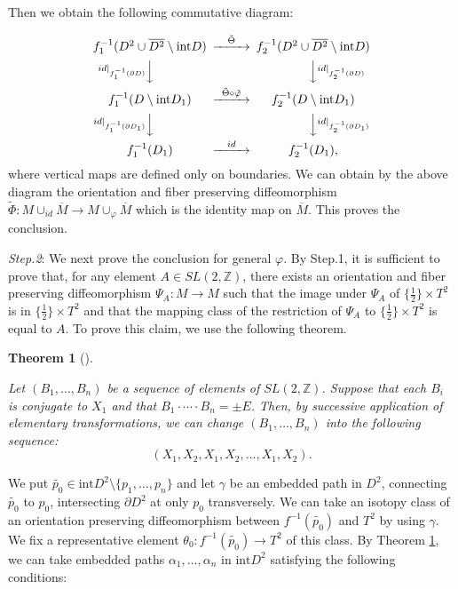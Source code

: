 \documentclass{amsart}
\theoremstyle{plain}
\newtheorem{thm}{Theorem}[section]
\theoremstyle{definition}
\begin{document}
Then we obtain the following commutative diagram: 

\[
\begin{CD}
f_1^{-1}(D^2\cup \overline{D^2}\setminus\text{int}D) @>\tilde{\Theta}>> f_2^{-1}(D^2\cup \overline{D^2}\setminus\text{int}D) \\
@V id|_{f_1^{-1}(\partial D)} VV @VV id|_{f_2^{-1}(\partial D)} V \\
f_1^{-1}(D\setminus\text{int}D_1) @>\tilde{\Theta}\circ\tilde{\varphi}>> f_2^{-1}(D\setminus\text{int}D_1) \\
@V id|_{f_1^{-1}(\partial D_1)} VV @VV id|_{f_2^{-1}(\partial D_1)} V \\
f_1^{-1}(D_1) @>id>> f_2^{-1}(D_1) ,
\end{CD}
\]
where vertical maps are defined only on boundaries. 
We can obtain by the above diagram the orientation and fiber preserving diffeomorphism $\tilde{\Phi}:M\cup_{id}\overline{M}\rightarrow M\cup_{\varphi}\overline{M}$ 
which is the identity map on $\overline{M}$. 
This proves the conclusion. 

\par

{\it Step.2}: We next prove the conclusion for general $\varphi$. 
By Step.1, it is sufficient to prove that, for any element $A\in SL(2,\mathbb{Z})$, there exists an orientation and fiber preserving diffeomorphism $\Psi_A:M\rightarrow M$ 
such that the image under $\Psi_A$ of $\{\frac{1}{2}\}\times T^2$ is in $\{\frac{1}{2}\}\times T^2$ and that the mapping class of the restriction of $\Psi_A$ to $\{\frac{1}{2}\}\times T^2$ is equal to $A$. 
To prove this claim, we use the following theorem. 

\begin{thm}[\cite{Matsumoto2}]\label{Matsumoto-thm}

Let $(B_1,\ldots,B_n)$ be a sequence of elements of $SL(2,\mathbb{Z})$. 
Suppose that each $B_i$ is conjugate to $X_1$ and that $B_1\cdot\cdots\cdot B_n=\pm E$. 
Then, by successive application of elementary transformations, we can change $(B_1,\ldots,B_n)$ into the following sequence: 
\[
(X_1,X_2,X_1,X_2,\ldots,X_1,X_2). 
\]

\end{thm}

We put $\tilde{p_0}\in\text{int}D^2\setminus\{p_1,\ldots,p_n\}$ and let $\gamma$ be an embedded path in $D^2$, connecting $\tilde{p_0}$ to $p_0$, 
intersecting $\partial D^2$ at only $p_0$ transversely. 
We can take an isotopy class of an orientation preserving diffeomorphism between $f^{-1}(\tilde{p_0})$ and $T^2$ by using $\gamma$. 
We fix a representative element $\theta_0:f^{-1}(\tilde{p_0})\rightarrow T^2$ of this class. 
By Theorem \ref{Matsumoto-thm}, we can take embedded paths $\alpha_1,\ldots,\alpha_n$ in $\text{int}D^2$ satisfying the following conditions: 
\end{document}
